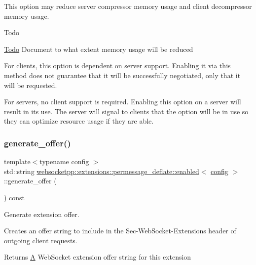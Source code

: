 This option may reduce server compressor memory usage and client decompressor memory usage. \begin{DoxyRefDesc}{Todo}
\item[\mbox{\hyperlink{todo__todo000012}{Todo}}]Document to what extent memory usage will be reduced\end{DoxyRefDesc}


For clients, this option is dependent on server support. Enabling it via this method does not guarantee that it will be successfully negotiated, only that it will be requested.

For servers, no client support is required. Enabling this option on a server will result in its use. The server will signal to clients that the option will be in use so they can optimize resource usage if they are able. \mbox{\label{classwebsocketpp_1_1extensions_1_1permessage__deflate_1_1enabled_adc342a368792f5beee8dddbbc5981846}} 
\subsubsection{\texorpdfstring{generate\+\_\+offer()}{generate\_offer()}}
{\footnotesize\ttfamily template$<$typename config $>$ \\
std\+::string \mbox{\hyperlink{classwebsocketpp_1_1extensions_1_1permessage__deflate_1_1enabled}{websocketpp\+::extensions\+::permessage\+\_\+deflate\+::enabled}}$<$ \mbox{\hyperlink{classconfig}{config}} $>$\+::generate\+\_\+offer (\begin{DoxyParamCaption}{ }\end{DoxyParamCaption}) const\hspace{0.3cm}{\ttfamily [inline]}}



Generate extension offer. 

Creates an offer string to include in the Sec-\/\+Web\+Socket-\/\+Extensions header of outgoing client requests.

\begin{DoxyReturn}{Returns}
\mbox{\hyperlink{struct_a}{A}} Web\+Socket extension offer string for this extension 
\end{DoxyReturn}
\mbox{\label{classwebsocketpp_1_1extensions_1_1permessage__deflate_1_1enabled_a0d842cb0cd2add8016e739dfcd675ba0}} 
